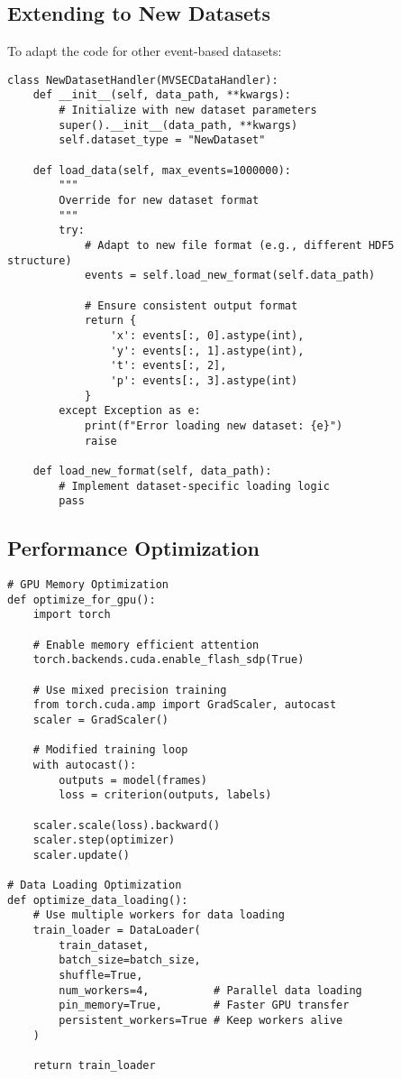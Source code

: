 \documentclass[12pt,a4paper]{article}
\begin{document}
\subsection{Extending to New Datasets}

To adapt the code for other event-based datasets:

\begin{lstlisting}[caption={Dataset Adaptation Template}]
class NewDatasetHandler(MVSECDataHandler):
    def __init__(self, data_path, **kwargs):
        # Initialize with new dataset parameters
        super().__init__(data_path, **kwargs)
        self.dataset_type = "NewDataset"

    def load_data(self, max_events=1000000):
        """
        Override for new dataset format
        """
        try:
            # Adapt to new file format (e.g., different HDF5 structure)
            events = self.load_new_format(self.data_path)

            # Ensure consistent output format
            return {
                'x': events[:, 0].astype(int),
                'y': events[:, 1].astype(int),
                't': events[:, 2],
                'p': events[:, 3].astype(int)
            }
        except Exception as e:
            print(f"Error loading new dataset: {e}")
            raise

    def load_new_format(self, data_path):
        # Implement dataset-specific loading logic
        pass
\end{lstlisting}

\subsection{Performance Optimization}

\begin{lstlisting}[caption={Optimization Techniques}]
# GPU Memory Optimization
def optimize_for_gpu():
    import torch

    # Enable memory efficient attention
    torch.backends.cuda.enable_flash_sdp(True)

    # Use mixed precision training
    from torch.cuda.amp import GradScaler, autocast
    scaler = GradScaler()

    # Modified training loop
    with autocast():
        outputs = model(frames)
        loss = criterion(outputs, labels)

    scaler.scale(loss).backward()
    scaler.step(optimizer)
    scaler.update()

# Data Loading Optimization
def optimize_data_loading():
    # Use multiple workers for data loading
    train_loader = DataLoader(
        train_dataset,
        batch_size=batch_size,
        shuffle=True,
        num_workers=4,          # Parallel data loading
        pin_memory=True,        # Faster GPU transfer
        persistent_workers=True # Keep workers alive
    )

    return train_loader
\end{lstlisting}
\end{document}
